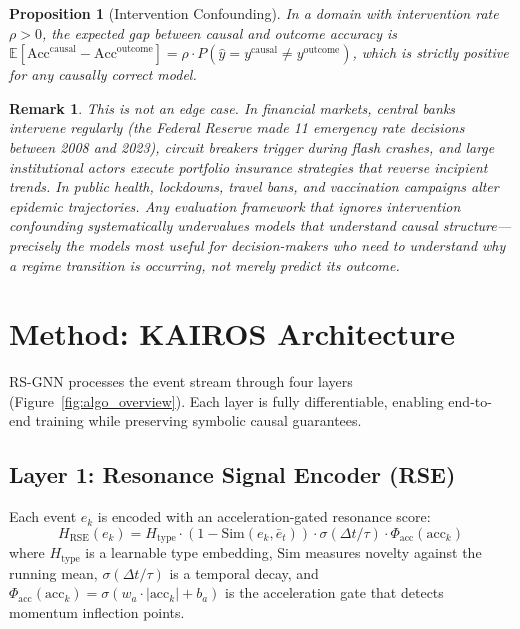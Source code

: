 \documentclass[11pt]{article}
\newtheorem{proposition}[theorem]{Proposition}
\newtheorem{remark}{Remark}
\newcommand{\E}{\mathbb{E}}
\newcommand{\RSE}{\mathrm{RSE}}
\begin{document}
\begin{proposition}[Intervention Confounding]
\label{prop:confound}
In a domain with intervention rate $\rho > 0$, the expected gap between causal and outcome accuracy is $\E[\text{Acc}^{\text{causal}} - \text{Acc}^{\text{outcome}}] = \rho \cdot P(\hat{y} = y^{\text{causal}} \neq y^{\text{outcome}})$, which is strictly positive for any causally correct model.
\end{proposition}

\begin{remark}
This is not an edge case. In financial markets, central banks intervene regularly (the Federal Reserve made 11 emergency rate decisions between 2008 and 2023), circuit breakers trigger during flash crashes, and large institutional actors execute portfolio insurance strategies that reverse incipient trends. In public health, lockdowns, travel bans, and vaccination campaigns alter epidemic trajectories. Any evaluation framework that ignores intervention confounding systematically undervalues models that understand causal structure---precisely the models most useful for decision-makers who need to understand \emph{why} a regime transition is occurring, not merely predict its outcome.
\end{remark}

\section{Method: KAIROS Architecture}

RS-GNN processes the event stream through four layers (Figure~\ref{fig:algo_overview}). Each layer is fully differentiable, enabling end-to-end training while preserving symbolic causal guarantees.

\subsection{Layer 1: Resonance Signal Encoder (RSE)}

Each event $e_k$ is encoded with an acceleration-gated resonance score:
\begin{equation}
    H_{\RSE}(e_k) = H_{\text{type}} \cdot (1 - \text{Sim}(e_k, \bar{e}_t)) \cdot \sigma(\Delta t / \tau) \cdot \Phi_{\text{acc}}(\text{acc}_k)
\end{equation}
where $H_{\text{type}}$ is a learnable type embedding, $\text{Sim}$ measures novelty against the running mean, $\sigma(\Delta t/\tau)$ is a temporal decay, and $\Phi_{\text{acc}}(\text{acc}_k) = \sigma(w_a \cdot |\text{acc}_k| + b_a)$ is the acceleration gate that detects momentum inflection points.
\end{document}
